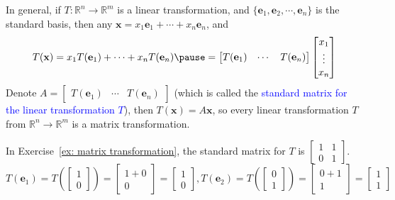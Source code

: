 \documentclass{beamer}
\theoremstyle{definition}
\theoremstyle{remark}
\begin{document}
\begin{frame}[t]
\begin{definition}
In general, if $T:\mathbb R^n\to\mathbb R^m$ is a linear transformation, and $\{\mathbf e_1,\mathbf e_2,\cdots,\mathbf e_n\}$ is the standard basis\pause, then any $\mathbf x=x_1\mathbf e_1+\cdots+x_n\mathbf e_n$, and\pause
\begin{equation}\label{12:47-06/08/2022}
T(\mathbf x)=x_1T(\mathbf e_1)+\cdots+x_nT(\mathbf e_n)\pause=\begin{bmatrix}
T(\mathbf e_1)&\cdots &T(\mathbf e_n)
\end{bmatrix}\begin{bmatrix}
x_1\\\vdots\\x_n
\end{bmatrix}
\end{equation}
Denote $A=\begin{bmatrix}
T(\mathbf e_1)&\cdots &T(\mathbf e_n)
\end{bmatrix}$ (which is called the \textcolor{blue}{standard matrix for the linear transformation $T$})\pause, then $T(\mathbf x)=A\mathbf x$, so every linear transformation $T$ from $\mathbb R^n\to\mathbb R^m$ is a matrix transformation.
\end{definition}
\pause
\begin{example}
In Exercise~\ref{ex: matrix transformation}, the standard matrix for $T$ is $\begin{bmatrix}
1&1\\0&1
\end{bmatrix}$.\pause
\vspace{-3mm}
\[
T(\mathbf e_1)=T\left(\begin{bmatrix}
1\\0
\end{bmatrix}\right)=\begin{bmatrix}
1+0\\0
\end{bmatrix}=\begin{bmatrix}
1\\0
\end{bmatrix}, T(\mathbf e_2)=T\left(\begin{bmatrix}
0\\1
\end{bmatrix}\right)=\begin{bmatrix}
0+1\\1
\end{bmatrix}=\begin{bmatrix}
1\\1
\end{bmatrix}
\]
\end{example}
\end{frame}
\end{document}
